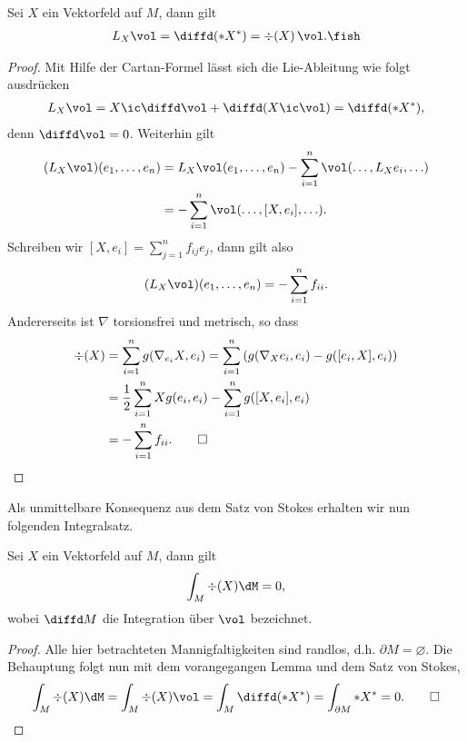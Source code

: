 \documentclass[%
	paper=a5,%
	fleqn,%
	DIV=18,%
	BCOR=0mm,
	fontsize=11pt,
	titlepage=false,%
	bibliography=totoc,
	DIV=18,%
	twoside=true,
	pdftitle=Riemannsche Geometrie,
	pdfauthor=Uwe Semmelmann,
	numbers=noendperiod]%
	{scrbook}
\begin{document}
\begin{prop}
Sei $X$ ein Vektorfeld auf $M$, dann gilt
\begin{align*}
L_{X}\vol = \diffd(*X^*) = \div(X)\,\vol.\fish
\end{align*}
\end{prop}
\begin{proof}
Mit Hilfe der Cartan-Formel lässt sich die Lie-Ableitung wie folgt ausdrücken
\begin{align*}
L_{X}\vol = X\ic \diffd\vol + \diffd(X\ic \vol) = \diffd(*X^*),
\end{align*}
denn $\diffd\vol = 0$. Weiterhin gilt
\begin{align*}
(L_{X}\vol)(e_{1},\ldots,e_{n}) &= L_{X}\vol(e_{1},\ldots,e_{n}) - \sum_{i=1}^n \vol(\ldots,L_{X}e_{i},\ldots)\\
&=- \sum_{i=1}^n\vol(\ldots,[X,e_{i}],\ldots).
\end{align*}
Schreiben wir $[X,e_{i}] = \sum_{j=1}^n f_{ij} e_{j}$, dann gilt also
\begin{align*}
(L_{X}\vol)(e_{1},\ldots,e_{n}) = - \sum_{i=1}^nf_{ii}.
\end{align*}
Andererseits ist $\nabla$ torsionsfrei und metrisch, so dass
\begin{align*}
\div(X) &= \sum_{i=1}^n g(\nabla_{e_{i}}X,e_{i}) = 
\sum_{i=1}^n \left(g(\nabla_{X}e_{i},e_{i}) -  g([e_{i},X],e_{i})\right)\\
&= \frac{1}{2}  \sum_{i=1}^n Xg(e_{i},e_{i})  - \sum_{i=1}^n g([X,e_{i}],e_{i})\\
&= -\sum_{i=1}^n f_{ii}.\qed
\end{align*}
\end{proof}

Als unmittelbare Konsequenz aus dem Satz von Stokes erhalten wir nun folgenden Integralsatz.

\begin{prop}
Sei $X$ ein Vektorfeld auf $M$, dann gilt
\begin{align*}
\int_{M}\div (X)\dM = 0,
\end{align*}
wobei $\diffd M$ die Integration über $\vol$ bezeichnet.\fish
\end{prop}
\begin{proof}
Alle hier betrachteten Mannigfaltigkeiten sind randlos, d.h. $\partial M  =\varnothing$. Die Behauptung folgt nun mit dem vorangegangen Lemma und dem Satz von Stokes,
\begin{align*}
\int_{M}\div(X)\dM = \int_{M}\div(X)\vol = \int_{M}\diffd(*X^*) = \int_{\partial M} *X^* = 0.\qed
\end{align*}
\end{proof}
\end{document}
